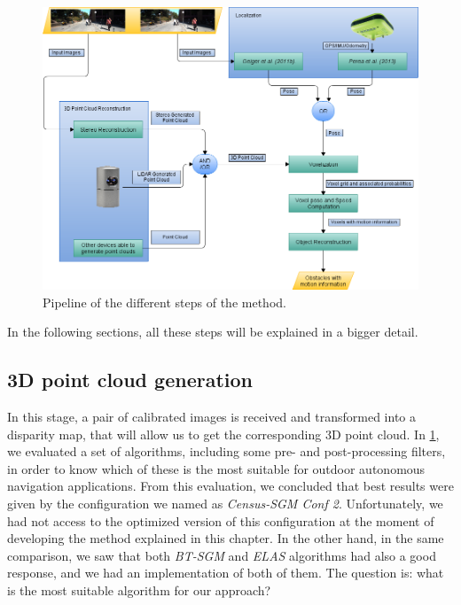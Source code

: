 \begin{figure}[thb]
  \centering
  \includegraphics{pipeline_general}
  \caption{Pipeline of the different steps of the method.  }
  \label{fig:cp05_pipeline_general}
\end{figure}

In the following sections, all these steps will be explained in a bigger detail.

\subsection{3D point cloud generation}\label{ch:chapter05_01_01}

In this stage, a pair of calibrated images is received and transformed into a disparity map, that will allow us to get the corresponding 3D point cloud. In \ref{fig:cp05_pipeline_general}, we evaluated a set of algorithms, including some pre- and post-processing filters, in order to know which of these is the most suitable for outdoor autonomous navigation applications. From this evaluation, we concluded that best results were given by the configuration we named as \emph{Census-SGM Conf 2}. Unfortunately, we had not access to the optimized version of this configuration at the moment of developing the method explained in this chapter. In the other hand, in the same comparison, we saw that both \emph{BT-SGM} and \emph{ELAS} algorithms had also a good response, and we had an implementation of both of them. The question is: what is the most suitable algorithm for our approach? 


